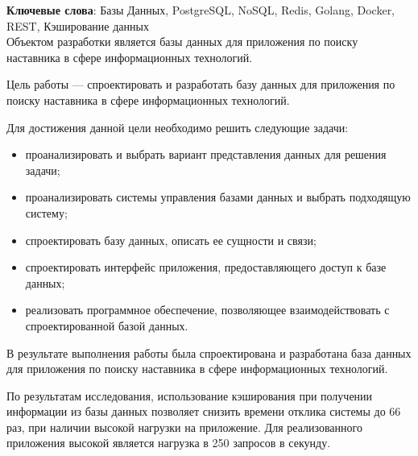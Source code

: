 \begin{essay}{}
    \noindent\textbf{Ключевые слова}: Базы Данных, PostgreSQL, NoSQL, Redis, Golang, Docker, REST, Кэширование данных\\
        
    Объектом разработки является базы данных для приложения по поиску наставника в сфере информационных технологий.
    
    Цель работы --- спроектировать и разработать базу данных для приложения по поиску наставника в сфере информационных технологий.
    
    Для достижения данной цели необходимо решить следующие задачи:
    
    \begin{itemize}
        \item проанализировать и выбрать вариант представления данных для решения задачи;
        \item проанализировать системы управления базами данных и выбрать подходящую систему;
        \item спроектировать базу данных, описать ее сущности и связи;
        \item спроектировать интерфейс приложения, предоставляющего доступ к базе данных;
        \item реализовать программное обеспечение, позволяющее взаимодействовать с спроектированной базой данных.
    \end{itemize}
    
    В результате выполнения работы была спроектирована и разработана база данных для приложения по поиску наставника в сфере информационных технологий.
    
    По результатам исследования, использование кэширования при получении информации из базы данных позволяет снизить времени отклика системы до 66 раз, при наличии высокой нагрузки на приложение. Для реализованного приложения высокой является нагрузка в 250 запросов в секунду.  
\end{essay}